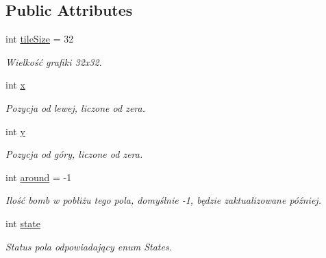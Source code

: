 \subsection*{Public Attributes}
\begin{DoxyCompactItemize}
\item 
\mbox{\label{class_saper_1_1_tile_af14b4a73e2ea580fe25cf29eba901f83}} 
int \mbox{\hyperlink{class_saper_1_1_tile_af14b4a73e2ea580fe25cf29eba901f83}{tile\+Size}} = 32
\begin{DoxyCompactList}\small\item\em Wielkość grafiki 32x32. \end{DoxyCompactList}\item 
\mbox{\label{class_saper_1_1_tile_a8861f08f0232b9e06b35f9539f97614e}} 
int \mbox{\hyperlink{class_saper_1_1_tile_a8861f08f0232b9e06b35f9539f97614e}{x}}
\begin{DoxyCompactList}\small\item\em Pozycja od lewej, liczone od zera. \end{DoxyCompactList}\item 
\mbox{\label{class_saper_1_1_tile_a4bee1eb877052349f14938b9d28eea87}} 
int \mbox{\hyperlink{class_saper_1_1_tile_a4bee1eb877052349f14938b9d28eea87}{y}}
\begin{DoxyCompactList}\small\item\em Pozycja od góry, liczone od zera. \end{DoxyCompactList}\item 
\mbox{\label{class_saper_1_1_tile_a049847b44328392d75c1e04276417191}} 
int \mbox{\hyperlink{class_saper_1_1_tile_a049847b44328392d75c1e04276417191}{around}} = -\/1
\begin{DoxyCompactList}\small\item\em Ilość bomb w pobliżu tego pola, domyślnie -\/1, będzie zaktualizowane później. \end{DoxyCompactList}\item 
\mbox{\label{class_saper_1_1_tile_a59c61b4cd8fc0665533989c017b23688}} 
int \mbox{\hyperlink{class_saper_1_1_tile_a59c61b4cd8fc0665533989c017b23688}{state}}
\begin{DoxyCompactList}\small\item\em Status pola odpowiadający enum States. \end{DoxyCompactList}\item 

\end{DoxyCompactItemize}
